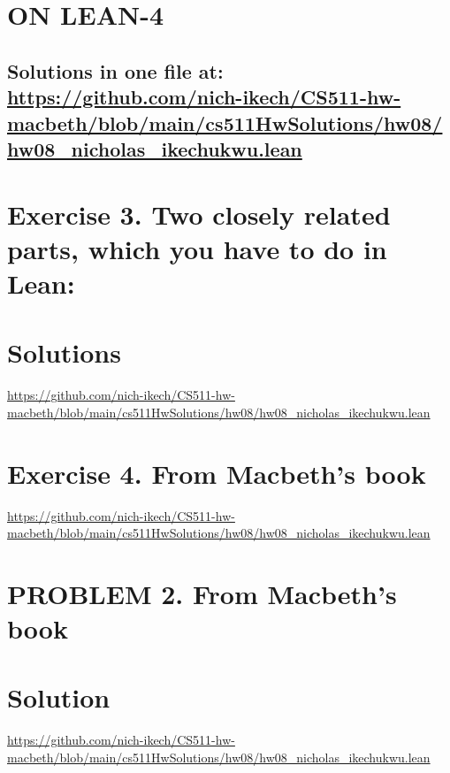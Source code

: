 \documentclass{article}
\begin{document}
\newpage







\section*{ON LEAN-4}
\subsection*{Solutions in one file at: 
\url{https://github.com/nich-ikech/CS511-hw-macbeth/blob/main/cs511HwSolutions/hw08/hw08_nicholas_ikechukwu.lean}}

\newpage

\section*{Exercise 3. Two closely related parts, which you have to do in Lean:}
\section*{Solutions}
\url{https://github.com/nich-ikech/CS511-hw-macbeth/blob/main/cs511HwSolutions/hw08/hw08_nicholas_ikechukwu.lean}

\newpage

\section*{Exercise 4. From Macbeth's book}

\url{https://github.com/nich-ikech/CS511-hw-macbeth/blob/main/cs511HwSolutions/hw08/hw08_nicholas_ikechukwu.lean}

\newpage

\section*{PROBLEM 2. From Macbeth's book}
\section*{Solution}

\url{https://github.com/nich-ikech/CS511-hw-macbeth/blob/main/cs511HwSolutions/hw08/hw08_nicholas_ikechukwu.lean}
\end{document}
